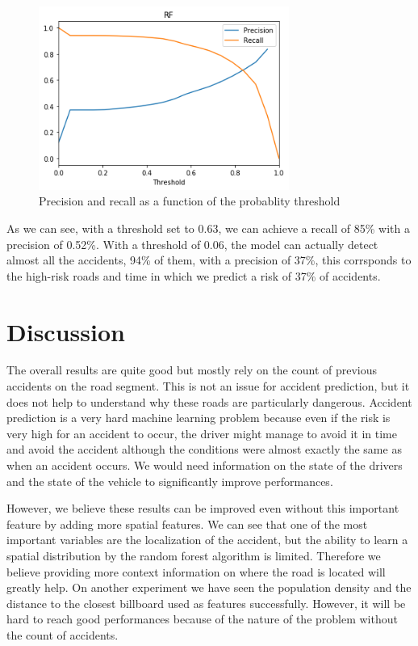 \documentclass[conference]{IEEEtran}
\begin{document}
\begin{figure}[htbp]
\centerline{\includegraphics[height=6cm, keepaspectratio]{figures/pr.png}}
\caption{Precision and recall as a function of the probablity threshold}
\label{fig}
\end{figure}

As we can see, with a threshold set to 0.63, we can achieve a recall of 85\% with a precision of 0.52\%. With a threshold of 0.06, the model can actually detect almost all the accidents, 94\% of them, with a precision of 37\%, this corrsponds to the high-risk roads and time in which we predict a risk of 37\% of accidents.

\section{Discussion}
The overall results are quite good but mostly rely on the count of previous accidents on the road segment. This is not an issue for accident prediction, but it does not help to understand why these roads are particularly dangerous. Accident prediction is a very hard machine learning problem because even if the risk is very high for an accident to occur, the driver might manage to avoid it in time and avoid the accident although the conditions were almost exactly the same as when an accident occurs. We would need information on the state of the drivers and the state of the vehicle to significantly improve performances. 

However, we believe these results can be improved even without this important feature by adding more spatial features. We can see that one of the most important variables are the localization of the accident, but the ability to learn a spatial distribution by the random forest algorithm is limited. Therefore we believe providing more context information on where the road is located will greatly help. On another experiment we have seen the population density and the distance to the closest billboard used as features successfully. However, it will be hard to reach good performances because of the nature of the problem without the count of accidents.
\end{document}
